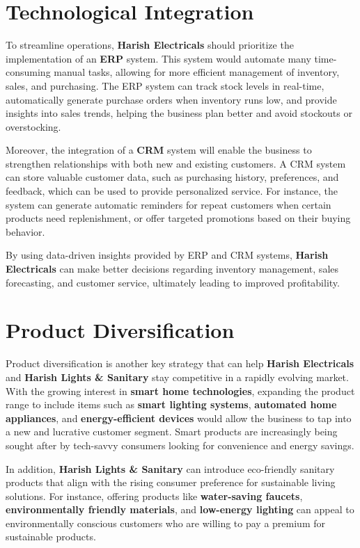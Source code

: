 \documentclass[a4paper,12pt]{report}
\begin{document}
\section{Technological Integration}
To streamline operations, \textbf{Harish Electricals} should prioritize the implementation of an \textbf{ERP} system. This system would automate many time-consuming manual tasks, allowing for more efficient management of inventory, sales, and purchasing. The ERP system can track stock levels in real-time, automatically generate purchase orders when inventory runs low, and provide insights into sales trends, helping the business plan better and avoid stockouts or overstocking.

Moreover, the integration of a \textbf{CRM} system will enable the business to strengthen relationships with both new and existing customers. A CRM system can store valuable customer data, such as purchasing history, preferences, and feedback, which can be used to provide personalized service. For instance, the system can generate automatic reminders for repeat customers when certain products need replenishment, or offer targeted promotions based on their buying behavior.

By using data-driven insights provided by ERP and CRM systems, \textbf{Harish Electricals} can make better decisions regarding inventory management, sales forecasting, and customer service, ultimately leading to improved profitability.

\section{Product Diversification}
Product diversification is another key strategy that can help \textbf{Harish Electricals} and \textbf{Harish Lights \& Sanitary} stay competitive in a rapidly evolving market. With the growing interest in \textbf{smart home technologies}, expanding the product range to include items such as \textbf{smart lighting systems}, \textbf{automated home appliances}, and \textbf{energy-efficient devices} would allow the business to tap into a new and lucrative customer segment. Smart products are increasingly being sought after by tech-savvy consumers looking for convenience and energy savings.

In addition, \textbf{Harish Lights \& Sanitary} can introduce eco-friendly sanitary products that align with the rising consumer preference for sustainable living solutions. For instance, offering products like \textbf{water-saving faucets}, \textbf{environmentally friendly materials}, and \textbf{low-energy lighting} can appeal to environmentally conscious customers who are willing to pay a premium for sustainable products.
\end{document}
